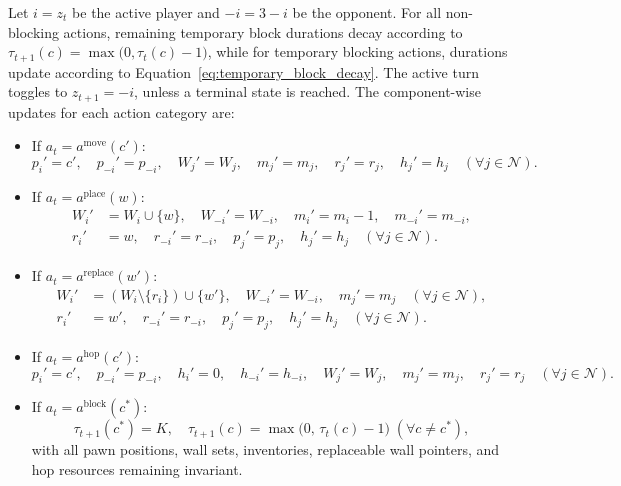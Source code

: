 \documentclass{article}
\begin{document}
Let $i = z_t$ be the active player and $-i = 3 - i$ be the opponent. For all non-blocking actions, remaining temporary block durations decay according to $\tau_{t+1}(c) = \max\big(0, \tau_t(c) - 1\big)$, while for temporary blocking actions, durations update according to Equation~\eqref{eq:temporary_block_decay}. The active turn toggles to $z_{t+1} = -i$, unless a terminal state is reached. The component-wise updates for each action category are:
\begin{itemize}
    \item If $a_t = a^{\text{move}}(c')$:
    \begin{equation}
    p_i' = c', \quad p_{-i}' = p_{-i}, \quad W_{j}' = W_{j}, \quad m_j' = m_j, \quad r_j' = r_j, \quad h_j' = h_j \quad (\forall j \in \mathcal{N}).
    \end{equation}
    
    \item If $a_t = a^{\text{place}}(w)$:
    \begin{align}
    W_i' &= W_i \cup \{w\}, \quad W_{-i}' = W_{-i}, \quad m_i' = m_i - 1, \quad m_{-i}' = m_{-i}, \\
    r_i' &= w, \quad r_{-i}' = r_{-i}, \quad p_j' = p_j, \quad h_j' = h_j \quad (\forall j \in \mathcal{N}).
    \end{align}
    
    \item If $a_t = a^{\text{replace}}(w')$:
    \begin{align}
    W_i' &= (W_i \setminus \{r_i\}) \cup \{w'\}, \quad W_{-i}' = W_{-i}, \quad m_j' = m_j \quad (\forall j \in \mathcal{N}), \\
    r_i' &= w', \quad r_{-i}' = r_{-i}, \quad p_j' = p_j, \quad h_j' = h_j \quad (\forall j \in \mathcal{N}).
    \end{align}
    
    \item If $a_t = a^{\text{hop}}(c')$:
    \begin{equation}
    p_i' = c', \quad p_{-i}' = p_{-i}, \quad h_i' = 0, \quad h_{-i}' = h_{-i}, \quad W_j' = W_j, \quad m_j' = m_j, \quad r_j' = r_j \quad (\forall j \in \mathcal{N}).
    \end{equation}
    
    \item If $a_t = a^{\text{block}}(c^*)$:
    \begin{equation}
    \tau_{t+1}(c^*) = K, \quad \tau_{t+1}(c) = \max\big(0, \, \tau_t(c) - 1\big) \; (\forall c \ne c^*),
    \end{equation}
    with all pawn positions, wall sets, inventories, replaceable wall pointers, and hop resources remaining invariant.
\end{itemize}
\end{document}
